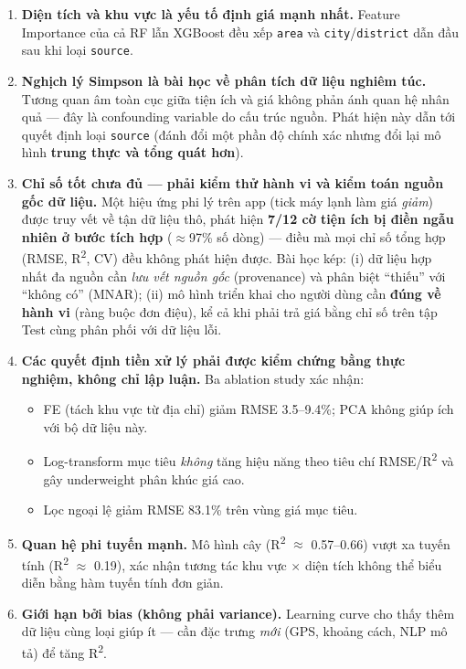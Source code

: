\begin{enumerate}[leftmargin=*, itemsep=5pt]
  \item \textbf{Diện tích và khu vực là yếu tố định giá mạnh nhất.}
        Feature Importance của cả RF lẫn XGBoost đều xếp \texttt{area}
        và \texttt{city}/\texttt{district} dẫn đầu sau khi loại \texttt{source}.

  \item \textbf{Nghịch lý Simpson là bài học về phân tích dữ liệu nghiêm túc.}
        Tương quan âm toàn cục giữa tiện ích và giá không phản ánh quan hệ nhân quả —
        đây là confounding variable do cấu trúc nguồn.
        Phát hiện này dẫn tới quyết định loại \texttt{source}
        (đánh đổi một phần độ chính xác nhưng đổi lại mô hình \textbf{trung thực và tổng quát hơn}).

  \item \textbf{Chỉ số tốt chưa đủ — phải kiểm thử hành vi và kiểm toán nguồn gốc dữ liệu.}
        Một hiệu ứng phi lý trên app (tick máy lạnh làm giá \textit{giảm}) được truy vết
        về tận dữ liệu thô, phát hiện \textbf{7/12 cờ tiện ích bị điền ngẫu nhiên ở bước
        tích hợp} ($\approx$97\% số dòng) — điều mà mọi chỉ số tổng hợp (RMSE, R\textsuperscript{2},
        CV) đều không phát hiện được. Bài học kép: (i) dữ liệu hợp nhất đa nguồn cần
        \textit{lưu vết nguồn gốc} (provenance) và phân biệt ``thiếu'' với ``không có''
        (MNAR); (ii) mô hình triển khai cho người dùng cần \textbf{đúng về hành vi}
        (ràng buộc đơn điệu), kể cả khi phải trả giá bằng chỉ số trên tập Test
        cùng phân phối với dữ liệu lỗi.

  \item \textbf{Các quyết định tiền xử lý phải được kiểm chứng bằng thực nghiệm, không chỉ lập luận.}
        Ba ablation study xác nhận:
        \begin{itemize}[itemsep=2pt]
          \item FE (tách khu vực từ địa chỉ) giảm RMSE 3.5--9.4\%;
                PCA không giúp ích với bộ dữ liệu này.
          \item Log-transform mục tiêu \textit{không} tăng hiệu năng theo tiêu chí RMSE/R\textsuperscript{2}
                và gây underweight phân khúc giá cao.
          \item Lọc ngoại lệ giảm RMSE 83.1\% trên vùng giá mục tiêu.
        \end{itemize}

  \item \textbf{Quan hệ phi tuyến mạnh.}
        Mô hình cây (R\textsuperscript{2} $\approx$ 0.57--0.66) vượt xa tuyến tính
        (R\textsuperscript{2} $\approx$ 0.19), xác nhận tương tác
        khu vực $\times$ diện tích không thể biểu diễn bằng hàm tuyến tính đơn giản.

  \item \textbf{Giới hạn bởi bias (không phải variance).}
        Learning curve cho thấy thêm dữ liệu cùng loại giúp ít —
        cần đặc trưng \textit{mới} (GPS, khoảng cách, NLP mô tả) để tăng R\textsuperscript{2}.
\end{enumerate}

